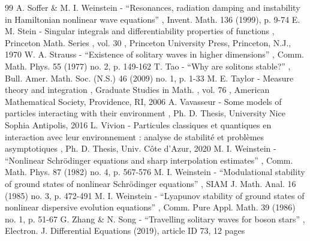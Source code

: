 \documentclass[11pt]{article}
\theoremstyle{definition}
\begin{document}
\begin{thebibliography}{99}
 A. Soffer \& M. I. Weinstein - “Resonances, radiation damping and instability in Hamiltonian nonlinear wave equations” , Invent. Math. 136 (1999), p. 9-74
 E. M. Stein - Singular integrals and differentiability properties of functions , Princeton Math. Series , vol. 30 , Princeton University Press, Princeton, N.J., 1970
 W. A. Strauss - “Existence of solitary waves in higher dimensions” , Comm. Math. Phys. 55 (1977) no. 2, p. 149-162
 T. Tao - “Why are solitons stable?” , Bull. Amer. Math. Soc. (N.S.) 46 (2009) no. 1, p. 1-33
 M. E. Taylor - Measure theory and integration , Graduate Studies in Math. , vol. 76 , American Mathematical Society, Providence, RI, 2006
 A. Vavasseur - Some models of particles interacting with their environment , Ph. D. Thesis, University Nice Sophia Antipolis, 2016
 L. Vivion - Particules classiques et quantiques en interaction avec leur environnement : analyse de stabilité et problèmes asymptotiques , Ph. D. Thesis, Univ. Côte d’Azur, 2020
 M. I. Weinstein - “Nonlinear Schrödinger equations and sharp interpolation estimates” , Comm. Math. Phys. 87 (1982) no. 4, p. 567-576
 M. I. Weinstein - “Modulational stability of ground states of nonlinear Schrödinger equations” , SIAM J. Math. Anal. 16 (1985) no. 3, p. 472-491
 M. I. Weinstein - “Lyapunov stability of ground states of nonlinear dispersive evolution equations” , Comm. Pure Appl. Math. 39 (1986) no. 1, p. 51-67
 G. Zhang \& N. Song - “Travelling solitary waves for boson stars” , Electron. J. Differential Equations (2019), article ID 73, 12 pages
\end{thebibliography}
\end{document}
